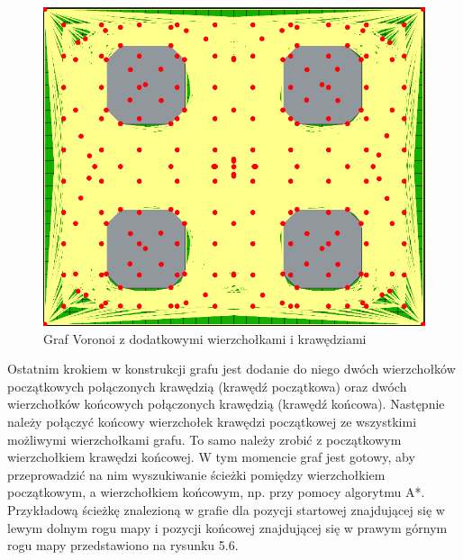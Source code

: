 \documentclass[a4paper,11pt,twoside]{report}
\theoremstyle{definition}
\begin{document}
\begin{figure}[h!]
\centering
\includegraphics[scale=0.4]{fullVoronoiGraphForExpandedMapWithExtraVertices}
\caption[Graf Voronoi z dodatkowymi wierzchołkami i krawędziami]{Graf Voronoi z dodatkowymi wierzchołkami i krawędziami}
\end{figure}

Ostatnim krokiem w konstrukcji grafu jest dodanie do niego dwóch wierzchołków początkowych połączonych krawędzią (krawędź początkowa) oraz dwóch wierzchołków końcowych połączonych krawędzią (krawędź końcowa). Następnie należy połączyć końcowy wierzchołek krawędzi początkowej ze wszystkimi możliwymi wierzchołkami grafu. To samo należy zrobić z początkowym wierzchołkiem krawędzi końcowej. W tym momencie graf jest gotowy, aby przeprowadzić na nim wyszukiwanie ścieżki pomiędzy wierzchołkiem początkowym, a wierzchołkiem końcowym, np. przy pomocy algorytmu A*. Przykładową ścieżkę znalezioną w grafie dla pozycji startowej znajdującej się w lewym dolnym rogu mapy i pozycji końcowej znajdującej się w prawym górnym rogu mapy przedstawiono na rysunku 5.6.
\end{document}
